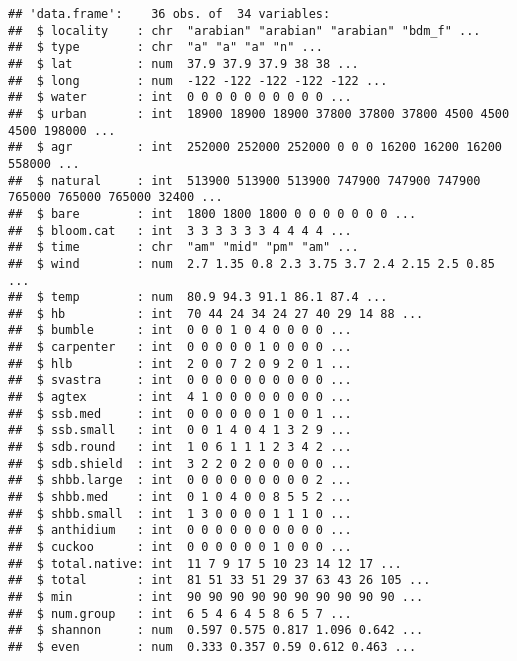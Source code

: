 \documentclass[
]{book}
\newenvironment{Shaded}{\begin{snugshade}}{\end{snugshade}}
\newcommand{\DataTypeTok}[1]{\textcolor[rgb]{0.13,0.29,0.53}{#1}}
\newcommand{\KeywordTok}[1]{\textcolor[rgb]{0.13,0.29,0.53}{\textbf{#1}}}
\newcommand{\NormalTok}[1]{#1}
\newcommand{\OperatorTok}[1]{\textcolor[rgb]{0.81,0.36,0.00}{\textbf{#1}}}
\newcommand{\StringTok}[1]{\textcolor[rgb]{0.31,0.60,0.02}{#1}}
\begin{document}
\begin{verbatim}
## 'data.frame':    36 obs. of  34 variables:
##  $ locality    : chr  "arabian" "arabian" "arabian" "bdm_f" ...
##  $ type        : chr  "a" "a" "a" "n" ...
##  $ lat         : num  37.9 37.9 37.9 38 38 ...
##  $ long        : num  -122 -122 -122 -122 -122 ...
##  $ water       : int  0 0 0 0 0 0 0 0 0 0 ...
##  $ urban       : int  18900 18900 18900 37800 37800 37800 4500 4500 4500 198000 ...
##  $ agr         : int  252000 252000 252000 0 0 0 16200 16200 16200 558000 ...
##  $ natural     : int  513900 513900 513900 747900 747900 747900 765000 765000 765000 32400 ...
##  $ bare        : int  1800 1800 1800 0 0 0 0 0 0 0 ...
##  $ bloom.cat   : int  3 3 3 3 3 3 4 4 4 4 ...
##  $ time        : chr  "am" "mid" "pm" "am" ...
##  $ wind        : num  2.7 1.35 0.8 2.3 3.75 3.7 2.4 2.15 2.5 0.85 ...
##  $ temp        : num  80.9 94.3 91.1 86.1 87.4 ...
##  $ hb          : int  70 44 24 34 24 27 40 29 14 88 ...
##  $ bumble      : int  0 0 0 1 0 4 0 0 0 0 ...
##  $ carpenter   : int  0 0 0 0 0 1 0 0 0 0 ...
##  $ hlb         : int  2 0 0 7 2 0 9 2 0 1 ...
##  $ svastra     : int  0 0 0 0 0 0 0 0 0 0 ...
##  $ agtex       : int  4 1 0 0 0 0 0 0 0 0 ...
##  $ ssb.med     : int  0 0 0 0 0 0 1 0 0 1 ...
##  $ ssb.small   : int  0 0 1 4 0 4 1 3 2 9 ...
##  $ sdb.round   : int  1 0 6 1 1 1 2 3 4 2 ...
##  $ sdb.shield  : int  3 2 2 0 2 0 0 0 0 0 ...
##  $ shbb.large  : int  0 0 0 0 0 0 0 0 0 2 ...
##  $ shbb.med    : int  0 1 0 4 0 0 8 5 5 2 ...
##  $ shbb.small  : int  1 3 0 0 0 0 1 1 1 0 ...
##  $ anthidium   : int  0 0 0 0 0 0 0 0 0 0 ...
##  $ cuckoo      : int  0 0 0 0 0 0 1 0 0 0 ...
##  $ total.native: int  11 7 9 17 5 10 23 14 12 17 ...
##  $ total       : int  81 51 33 51 29 37 63 43 26 105 ...
##  $ min         : int  90 90 90 90 90 90 90 90 90 90 ...
##  $ num.group   : int  6 5 4 6 4 5 8 6 5 7 ...
##  $ shannon     : num  0.597 0.575 0.817 1.096 0.642 ...
##  $ even        : num  0.333 0.357 0.59 0.612 0.463 ...
\end{verbatim}

\begin{Shaded}
\end{Shaded}
\end{document}
